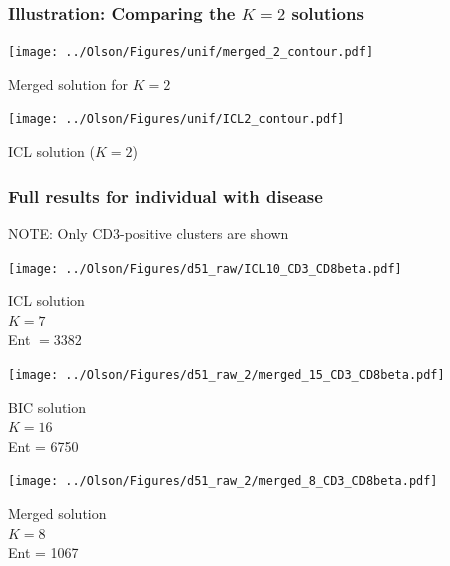 \documentclass[mathserif,compress]{beamer}
\renewcommand\;{\,}
\begin{document}
\begin{frame}\frametitle{Illustration: Comparing the $K = 2$ solutions}
\begin{center}

\begin{minipage}{0.45\linewidth}
\texttt{[image: ../Olson/Figures/unif/merged\_2\_contour.pdf]}
\begin{center}
Merged solution for $K = 2$
\end{center}
\end{minipage}
\hfill
\begin{minipage}{0.45\linewidth}
\texttt{[image: ../Olson/Figures/unif/ICL2\_contour.pdf]}
\begin{center}
ICL solution ($K = 2$)
\end{center}
\end{minipage}
\end{center}
\end{frame}

\begin{frame}\frametitle{Full results for individual with disease}
\alert{NOTE}: Only CD3-positive clusters are shown
\begin{center}
\begin{minipage}{0.3\linewidth}
\texttt{[image: ../Olson/Figures/d51\_raw/ICL10\_CD3\_CD8beta.pdf]}
\begin{center}
ICL solution
\\$K = 7$
\\Ent $=3382$ 
\end{center}
\end{minipage}
\hfill
\begin{minipage}{0.3\linewidth}
\texttt{[image: ../Olson/Figures/d51\_raw\_2/merged\_15\_CD3\_CD8beta.pdf]}
\begin{center}
BIC solution
\\
$K = 16$
\\
Ent = 6750
\end{center}
\end{minipage}
\hfill
\begin{minipage}{0.3\linewidth}
\texttt{[image: ../Olson/Figures/d51\_raw\_2/merged\_8\_CD3\_CD8beta.pdf]}
\begin{center}
Merged solution
\\
$K = 8$
\\
Ent = 1067
\end{center}
\end{minipage}
\end{center}
\end{frame}
\end{document}
